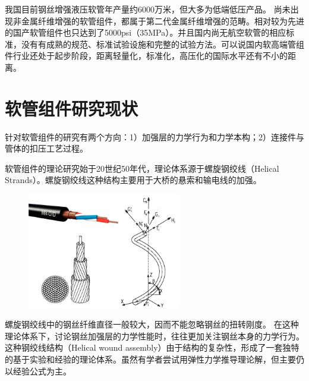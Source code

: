 \begin{figure}[!htbp]
	\centering
	\hspace{0.5cm}
	\label{fig:kevlarhose}
\end{figure}


我国目前钢丝增强液压软管年产量约6000万米\cite{xuhaitao2013}，但大多为低端低压产品。
尚未出现非金属纤维增强的软管组件，都属于第二代金属纤维增强的范畴。相对较为先进的国产软管组件也只达到了5000psi（35MPa）。并且国内尚无航空软管的相应标准，没有有成熟的规范、标准试验设施和完整的试验方法。可以说国内软高端管组件行业还处于起步阶段，距离轻量化，标准化，高压化的国际水平还有不小的距离。

\section{软管组件研究现状}
针对软管组件的研究有两个方向：1）加强层的力学行为和力学本构；2）连接件与管体的扣压工艺过程。

软管组件的理论研究始于20世纪50年代，理论体系源于螺旋钢绞线（Helical Strands）。螺旋钢绞线这种结构主要用于大桥的悬索和输电线的加强。
\begin{figure}[!htbp]
	\centering
	\includegraphics[width=0.6\textwidth]{figure/chap1/helical-strands}
\end{figure}
螺旋钢绞线中的钢丝纤维直径一般较大，因而不能忽略钢丝的扭转刚度。
在这种理论体系下，讨论钢丝加强层的力学性能时，往往更加关注钢丝本身的力学行为。这种钢绞线结构（Helical wound assembly）由于结构的复杂性，形成了一套独特的基于实验和经验的理论体系\cite{Cardou1997}。虽然有学者尝试用弹性力学推导理论解\cite{phillips1972,machida1973}，但主要仍以经验公式为主。

